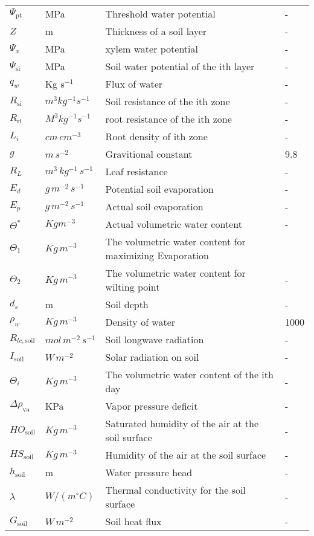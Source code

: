 \documentclass[12pt]{report}
\begin{document}
\begin{center}
\begin{longtable}{l l p{3in} p{0.5in}}
$\Psi_{\text{pt}}$	&	MPa	&	Threshold water potential	&	-	\\
$Z$	&	m	&	Thickness of a soil layer	&	-	\\
$\Psi_x$	&	MPa	&	xylem water potential	&	-	\\
$\Psi_{\text{si}}$	&	MPa	&	Soil water potential of the ith layer	&	-	\\
$q_w$	&	Kg s$^{-1}$	&	Flux of water	&	-	\\
$R_{\text{si}}$	&	$m^3 kg^{-1} s^{-1}$	&	Soil resistance of the ith zone	&	-	\\
$R_{\text{ri}}$	&	$M^3 kg^{-1} s^{-1}$	&	root resistance of the ith zone	&	-	\\
$L_i$	&	$cm\, cm^{-3}$	&	Root density of ith zone	&	-	\\
$g$	&	$m\, s^{-2}$	&	Gravitional constant	&	9.8	\\
$R_L$	&	$m^3\, kg^{-1}\, s^{-1}$	&	Leaf resistance	&	-	\\
$E_d$	&	$g\, m^{-2}\, s^{-1}$	&	Potential soil evaporation	&	-	\\
$E_p$	&	$g\, m^{-2}\, s^{-1}$	&	Actual soil evaporation	&	-	\\
$\Theta^{*}$	&	$Kg m^{-3}$	&	Actual volumetric water content	&	-	\\
$\Theta_1$	&	$Kg\, m^{-3}$	&	The volumetric water content for maximizing Evaporation	&		\\
$\Theta_2$	&	$Kg\, m^{-3}$	&	The volumetric water content for wilting point	&	-	\\
$d_s$	&	m	&	Soil depth	&	-	\\
$\rho_w$	&	$Kg\, m^{-3}$	&	Density of water	&	1000	\\
$R_{lc,\text{soil}}$	&	$mol\, m^{-2}\, s^{-1}$	&	Soil longwave radiation	&	-	\\
$I_{\text{soil}}$	&	$W\, m^{-2}$	&	Solar radiation on soil	&	-	\\
$\Theta_i$	&	$Kg\, m^{-3}$	&	The volumetric water content of the ith day	&	-	\\
$\Delta \rho_{\text{va}}$	&	KPa	&	Vapor pressure deficit	&	-	\\
$HO_{\text{soil}}$	&	$Kg\,m^{-3}$	&	Saturated humidity of the air at the soil surface	&	-	\\
$HS_{\text{soil}}$	&	$Kg\, m^{-3}$	&	Humidity of the air at the soil surface	&	-	\\
$h_{\text{soil}}$	&	m	&	Water pressure head	&	-	\\
$\lambda$	&	$W/(m ^\circ C)$	&	Thermal conductivity for the soil surface	&	-	\\
$G_{\text{soil}}$	&	$W\,m^{-2}$	&	Soil heat flux	&	-	\\
\end{longtable}
\end{center}
\end{document}
